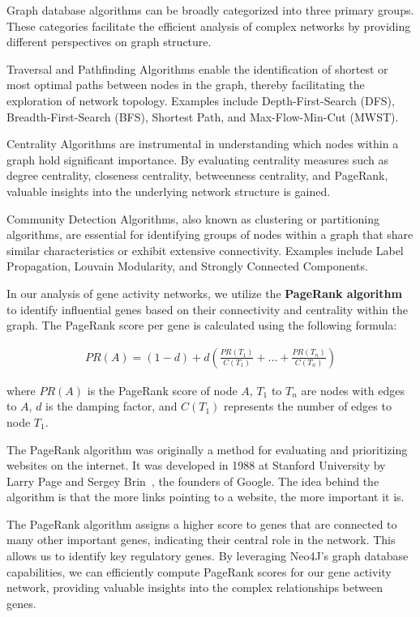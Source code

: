 Graph database algorithms can be broadly categorized into three primary groups.
These categories facilitate the efficient analysis of complex networks
by providing different perspectives on graph structure.

Traversal and Pathfinding Algorithms enable the identification of shortest or
most optimal paths between nodes in the graph, thereby facilitating the exploration of network topology.
Examples include Depth-First-Search (DFS), Breadth-First-Search (BFS), Shortest Path, and Max-Flow-Min-Cut (MWST).

Centrality Algorithms are instrumental in understanding which nodes within a graph hold significant importance.
By evaluating centrality measures such as degree centrality, closeness centrality, betweenness centrality,
and PageRank, valuable insights into the underlying network structure is gained.

Community Detection Algorithms, also known as clustering or partitioning algorithms,
are essential for identifying groups of nodes within a graph that share similar characteristics
or exhibit extensive connectivity.
Examples include Label Propagation, Louvain Modularity, and Strongly Connected Components.
\cite{neo4j_graph_algorithms}


In our analysis of gene activity networks,
we utilize the \textbf{PageRank algorithm} to identify influential genes based on their connectivity and
centrality within the graph.
The PageRank score per gene is calculated using the following formula:

\begin{align*}
PR(A)=(1-d)+d(\frac{PR(T_1)}{C(T_1)}+...+\frac{PR(T_n)}{C(T_n)})
\end{align*}

where $PR(A)$ is the PageRank score of node $A$,
$T_1$ to $T_n$ are nodes with edges to $A$,
$d$ is the damping factor,
and $C(T_1)$ represents the number of edges to node $T_1$.

The PageRank algorithm was originally a method for evaluating and prioritizing websites on the internet.
It was developed in 1988 at Stanford University by Larry Page and Sergey Brin~\cite{page1999pagerank},
the founders of Google.
The idea behind the algorithm is that the more links pointing to a website, the more important it is.

The PageRank algorithm assigns a higher score to genes that are connected to many other important genes,
indicating their central role in the network.
This allows us to identify key regulatory genes.
By leveraging Neo4J's graph database capabilities,
we can efficiently compute PageRank scores for our gene activity network,
providing valuable insights into the complex relationships between genes.
